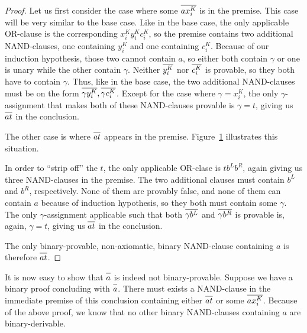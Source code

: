 \begin{proof}
Let us first consider the case where some $\ol{ax^K_i}$ is in the premise.
This case will be very similar to the base case.
Like in the base case, the only applicable OR-clause is the corresponding $x^K_iy^K_ic^K_i$, so the premise contains two additional NAND-clauses, one containing $y^K_i$ and one containing $c^K_i$.
Because of our induction hypothesis, those two cannot contain $a$, so either both contain $\gamma$ or one is unary while the other contain $\gamma$.
Neither $\ol{y^K_i}$ nor $\ol{c^K_i}$ is provable, so they both have to contain $\gamma$.
Thus, like in the base case, the two additional NAND-clauses must be on the form $\ol{\gamma y^K_i},\ol{\gamma c^K_i}$.
Except for the case where $\gamma = x^K_i$, the only $\gamma$-assignment that makes both of these NAND-clauses provable is $\gamma = t$, giving us $\ol{at}$ in the conclusion.

The other case is where $\ol{at}$ appears in the premise.
Figure~\ref{fig:nand_inductive_step} illustrates this situation.\par
\begin{figure}[!h]
  \centering
  \begin{prooftree*}
    \Hypo{\dots}
    \Hypo{\dots}
  \end{prooftree*}
  \caption{}
  \label{fig:nand_inductive_step}
\end{figure}
In order to ``strip off'' the $t$, the only applicable OR-clase is $tb^Lb^R$, again giving us three NAND-clauses in the premise.
The two additional clauses must contain $b^L$ and $b^R$, respectively.
None of them are provably false, and none of them can contain $a$ because of induction hypothesis, so they both must contain some $\gamma$.
The only $\gamma$-assignment applicable such that both $\ol{\gamma b^L}$ and $\ol{\gamma b^R}$ is provable is, again, $\gamma = t$, giving us $\ol{at}$ in the conclusion.

The only binary-provable, non-axiomatic, binary NAND-clause containing $a$ is therefore $\ol{at}$.
\end{proof}

It is now easy to show that $\ol{a}$ is indeed not binary-provable.
Suppose we have a binary proof concluding with $\ol{a}$.
There must exists a NAND-clause in the immediate premise of this conclusion containing either $\ol{at}$ or some $\ol{ax^K_i}$.
Because of the above proof, we know that no other binary NAND-clauses containing $a$ are binary-derivable.

